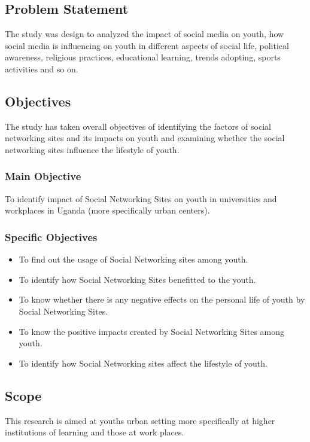 \documentclass[options]{article}
\begin{document}
\subsection{\textbf{Problem Statement}}
The study was design to analyzed the impact of social media on youth, how social media is influencing on youth in different aspects of social life, political awareness, religious practices, educational learning, trends adopting, sports activities and so on.
\subsection{\textbf{Objectives}}
The study has taken overall objectives of identifying the factors of social networking sites and its impacts on youth and examining whether the social networking sites influence the lifestyle of youth.

\subsubsection{\textbf{Main Objective}} 
To identify impact of Social Networking Sites on youth in universities and workplaces in Uganda (more specifically urban centers).

\subsubsection{\textbf{Specific Objectives}}

\begin{itemize}
  \item To find out the usage of Social Networking sites among youth.
  \item To identify how Social Networking Sites benefitted to the youth.
  \item To know whether there is any negative effects on the personal life of youth by Social Networking Sites.
   \item To know the positive impacts created by Social Networking Sites among youth.
   \item To identify how Social Networking sites affect the lifestyle of youth.
\end{itemize}


\subsection{\textbf{Scope}}
This research is aimed at youths urban setting more specifically at  higher institutions of learning and those at work places.
\end{document}
